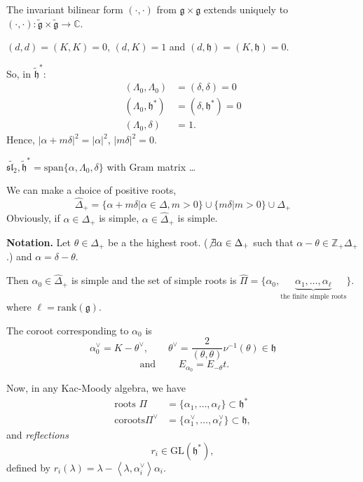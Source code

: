 \medskip\noindent
The invariant bilinear form $(\cdot,\cdot)$ from $\mathfrak{g} \times
\mathfrak{g}$ extends uniquely to
$(\cdot,\cdot):\tilde{\mathfrak{g}}\times\tilde{\mathfrak{g}}\to \mathbb{C}$.

$(d,d)=(K,K)=0$, $(d,K)=1$ and $(d,\mathfrak{h})=(K,\mathfrak{h})=0$.

\medskip\noindent
So, in $\tilde{\mathfrak{h}}^*$:
\begin{align*}
(\Lambda_0,\Lambda_0)&=(\delta,\delta)=0\\
(\Lambda_0,\mathfrak{h}^*)&=(\delta,\mathfrak{h}^*)=0\\
(\Lambda_0,\delta)&=1.
\end{align*}
Hence, $|\alpha+m \delta|^2=|\alpha|^2$, $|m \delta|^2=0$.

\begin{example}
\label{example-sl2hat}
$\widetilde{\mathfrak{sl}_2}, \tilde{\mathfrak{h}}^*
=\text{span}\{\alpha,\Lambda_0,\delta\}$ with Gram matrix …
\end{example}

We can make a choice of positive roots,
$$
\hat{\Delta}_+=\{\alpha+m \delta |\alpha \in \Delta, m>0\}
\cup \{m \delta|m>0\} \cup \Delta_+
$$
Obviously, if $\alpha \in \Delta_+$ is simple, 
$\alpha \in \hat{\Delta}_+$ is simple.

\medskip\noindent
{\bf Notation.} Let $\theta \in \Delta_+$ be a the highest root. ($\not \exists
\alpha \in \Delta_+$ such that $\alpha-\theta \in \mathbb{Z}_+ \Delta_+$.) and
 $\alpha=\delta-\theta$.

Then $\alpha_0 \in \hat{\Delta}_+$ is simple and the set of simple roots is
$\hat{\Pi}=\{\alpha_0,\underbrace{\alpha_1,\ldots,\alpha_\ell}_{\text{
the finite simple roots}}\}.$
where $\ell=\text{rank}(\mathfrak{g})$.

The coroot corresponding to $\alpha_0$ is 
$$
\alpha^\vee_0=K-\theta^\vee, \qquad
\theta^\vee=\frac{2}{(\theta,\theta)}\nu^{-1}(\theta) \in \mathfrak{h} 
$$
$$
\text{ and }\qquad E_{\alpha_0}=E_{-\theta}t.
$$

\medskip\noindent
Now, in any Kac-Moody algebra, we have
\begin{align*}
\text{roots }\Pi&=\{\alpha_1,\ldots,\alpha_\ell\}\subset\mathfrak{h}^* \\
\text{coroots} \Pi^\vee&=\{\alpha_1^\vee,\ldots,\alpha_\ell^\vee\}\subset
\mathfrak{h},
\end{align*}
and {\it reflections}
$$
r_i \in \text{GL}(\mathfrak{h}^*),
$$
defined by $r_i(\lambda)=\lambda-\left<\lambda,\alpha_i^\vee\right>\alpha_i$.

